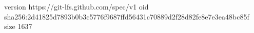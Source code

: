 version https://git-lfs.github.com/spec/v1
oid sha256:2d41825d7893b0b3c5776f9687ffd56431c70889d2f28d82fe8e7e3ea48bc85f
size 1637
